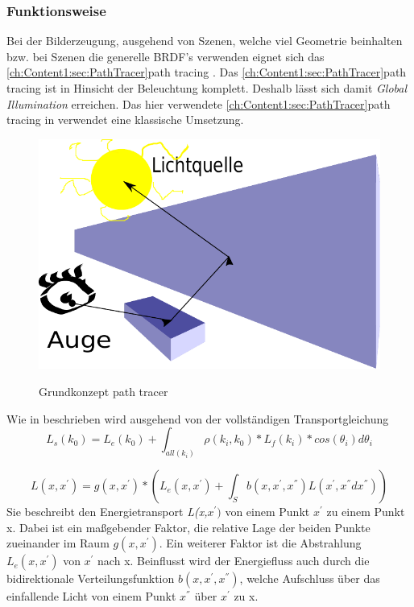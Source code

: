 \subsubsection{Funktionsweise}
Bei der Bilderzeugung, ausgehend von Szenen, welche viel Geometrie beinhalten bzw. bei Szenen 
die generelle BRDF's verwenden eignet sich das \ref{ch:Content1:sec:PathTracer}path tracing \cite{kajiya1986rendering}.
Das \ref{ch:Content1:sec:PathTracer}path tracing ist in Hinsicht der Beleuchtung komplett. Deshalb lässt sich damit
\textit{Global Illumination} erreichen. Das hier verwendete \ref{ch:Content1:sec:PathTracer}path tracing in 
\cite[eragae]{Benty18} verwendet eine klassische Umsetzung.\par

\begin{figure}[H]
    \centering
    \includegraphics[width=0.7\linewidth]{content/PathTracer/Bilder/Grundkonzept_path_tracing.pdf}
    \label{pic::PathTracingGrundkonzept}
    \caption{Grundkonzept path tracer}
\end{figure}


Wie in \cite{marschner2009fundamentals} beschrieben wird ausgehend von der vollständigen Transportgleichung
\begin{equation}
    L_s(k_0) = L_e(k_0) + \int_{all(k_i)}^{} \rho(k_i, k_0)*L_f(k_i)*cos(\theta_i)d\theta_i
\end{equation}
    
\begin{equation}
        L(x,{x}^{'}) = g(x,{x}^{'}) * (L_{e}(x,{x}^{'}) + 
                        \int_{S}^{} b(x,{x}^{'},{x}^{''})
                        L({x}^{'},{x}^{''}d{x}^{''})) 
\end{equation}
Sie beschreibt den Energietransport \textit{L(x,${x}^{'})$} von einem Punkt ${x}^{'}$
zu einem Punkt x. Dabei ist ein maßgebender Faktor, die relative Lage der beiden Punkte
zueinander im Raum $g(x,{x}^{'})$. Ein weiterer Faktor ist die Abstrahlung 
$L_{e}(x,{x}^{'})$ von ${x}^{'}$ nach x. Beinflusst wird der Energiefluss auch durch
die bidirektionale Verteilungsfunktion $b(x,{x}^{'},{x}^{''})$, welche Aufschluss über
das einfallende Licht von einem Punkt ${x}^{''}$ über ${x}^{'}$ zu x.

